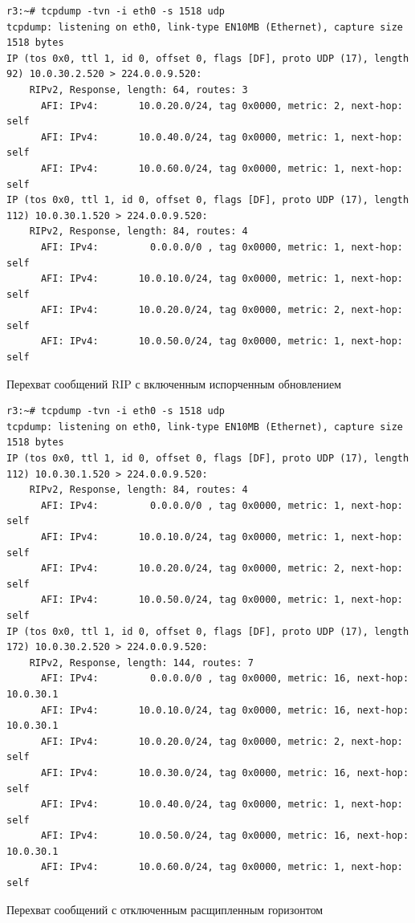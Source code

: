 \documentclass[a4paper,12pt]{article}
\begin{document}
\begin{Verbatim}
r3:~# tcpdump -tvn -i eth0 -s 1518 udp
tcpdump: listening on eth0, link-type EN10MB (Ethernet), capture size 1518 bytes
IP (tos 0x0, ttl 1, id 0, offset 0, flags [DF], proto UDP (17), length 92) 10.0.30.2.520 > 224.0.0.9.520: 
	RIPv2, Response, length: 64, routes: 3
	  AFI: IPv4:       10.0.20.0/24, tag 0x0000, metric: 2, next-hop: self
	  AFI: IPv4:       10.0.40.0/24, tag 0x0000, metric: 1, next-hop: self
	  AFI: IPv4:       10.0.60.0/24, tag 0x0000, metric: 1, next-hop: self
IP (tos 0x0, ttl 1, id 0, offset 0, flags [DF], proto UDP (17), length 112) 10.0.30.1.520 > 224.0.0.9.520: 
	RIPv2, Response, length: 84, routes: 4
	  AFI: IPv4:         0.0.0.0/0 , tag 0x0000, metric: 1, next-hop: self
	  AFI: IPv4:       10.0.10.0/24, tag 0x0000, metric: 1, next-hop: self
	  AFI: IPv4:       10.0.20.0/24, tag 0x0000, metric: 2, next-hop: self
	  AFI: IPv4:       10.0.50.0/24, tag 0x0000, metric: 1, next-hop: self
\end{Verbatim}

Перехват сообщений RIP с включенным испорченным обновлением

\begin{Verbatim}
r3:~# tcpdump -tvn -i eth0 -s 1518 udp
tcpdump: listening on eth0, link-type EN10MB (Ethernet), capture size 1518 bytes
IP (tos 0x0, ttl 1, id 0, offset 0, flags [DF], proto UDP (17), length 112) 10.0.30.1.520 > 224.0.0.9.520: 
	RIPv2, Response, length: 84, routes: 4
	  AFI: IPv4:         0.0.0.0/0 , tag 0x0000, metric: 1, next-hop: self
	  AFI: IPv4:       10.0.10.0/24, tag 0x0000, metric: 1, next-hop: self
	  AFI: IPv4:       10.0.20.0/24, tag 0x0000, metric: 2, next-hop: self
	  AFI: IPv4:       10.0.50.0/24, tag 0x0000, metric: 1, next-hop: self
IP (tos 0x0, ttl 1, id 0, offset 0, flags [DF], proto UDP (17), length 172) 10.0.30.2.520 > 224.0.0.9.520: 
	RIPv2, Response, length: 144, routes: 7
	  AFI: IPv4:         0.0.0.0/0 , tag 0x0000, metric: 16, next-hop: 10.0.30.1
	  AFI: IPv4:       10.0.10.0/24, tag 0x0000, metric: 16, next-hop: 10.0.30.1
	  AFI: IPv4:       10.0.20.0/24, tag 0x0000, metric: 2, next-hop: self
	  AFI: IPv4:       10.0.30.0/24, tag 0x0000, metric: 16, next-hop: self
	  AFI: IPv4:       10.0.40.0/24, tag 0x0000, metric: 1, next-hop: self
	  AFI: IPv4:       10.0.50.0/24, tag 0x0000, metric: 16, next-hop: 10.0.30.1
	  AFI: IPv4:       10.0.60.0/24, tag 0x0000, metric: 1, next-hop: self
\end{Verbatim}

Перехват сообщений с отключенным расщипленным горизонтом
\end{document}
